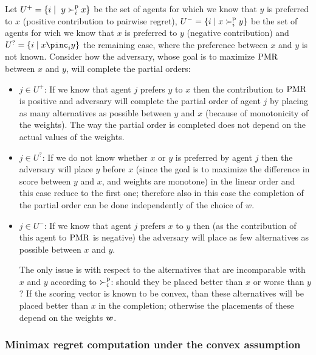Let $U^+=\{ i \mid \ y \succ^\text{p}_i x\}$ be the set of agents for which we know that $y$ is preferred to $x$ (positive contribution to pairwise regret), $U^-=\{ i \mid x \succ^\text{p}_i y\}$ 
be the set of agents for wich we  know that $x$ is preferred to $y$ (negative contribution) and 
$U^?=\{ i \mid x \pinc_i y\}$ 
the remaining case, where the preference between $x$ and $y$ is not known.
Consider how the adversary, whose goal is to maximize $\operatorname{PMR}$ between $x$ and $y$, will complete the partial orders:
\begin{itemize}
 \item $j \in U^+$: If we know that agent $j$ prefers $y$ to $x$ then the contribution to $\operatorname{PMR}$ is positive and adversary will complete the partial order of agent $j$ by placing as many alternatives as possible between $y$ and $x$ (because of monotonicity of the weights).
 The way the partial order is completed does not depend on the actual values of the weights.

 \item $j \in U^?$: If we do not know whether $x$ or $y$ is preferred by agent $j$ then the adversary will place $y$ before $x$ (since the goal is to maximize the difference in score between $y$ and $x$, and weights are monotone) in the linear order and this case reduce to the first one; therefore also in this case the completion of the partial order can be done independently of the choice of $w$.

 \item $j \in U^-$: If we know that agent $j$ prefers $x$ to $y$ then (as the contribution of this agent to $\operatorname{PMR}$ is negative) the adversary will place as few alternatives as possible between $x$ and $y$.

The only issue is with respect to the  alternatives that are incomparable with $x$ and $y$ according to $\succ^\text{p}_i$: should they be placed better than $x$ or worse than $y$ ?
If the scoring vector is known to be convex,  than these alternatives will be placed better than $x$ in the completion; otherwise the placements of these depend on the weights $\bm{w}$.
\end{itemize}

\subsubsection{Minimax regret computation under the convex assumption}

